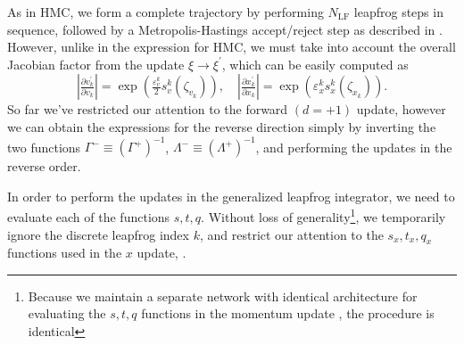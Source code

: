 \documentclass{article} %
\begin{document}
As in HMC, we form a complete trajectory by performing \(N_{\mathrm{LF}}\) leapfrog steps in sequence, followed by a
Metropolis-Hastings accept/reject step as described in .
%
However, unlike in the expression for HMC, we must take into account the overall Jacobian factor from the update
\(\xi\rightarrow\xi^{\prime}\), which can be easily computed as 
%
\begin{equation}
   \left|\tfrac{\partial v^{\prime}_{k}}{\partial v_{k}}\right| 
   = \exp{\left(\tfrac{\varepsilon^{k}_{v}}{2}s^{k}_{v}(\zeta_{v_{k}})\right)},\quad
   \left|\tfrac{\partial x^{\prime}_{k}}{\partial x_{k}}\right| 
   = \exp{\left(\varepsilon^{k}_{x} s^{k}_{x}(\zeta_{x_{k}})\right)}.
\end{equation}
%
So far we've restricted our attention to the forward \((d=+1)\) update, however we can obtain the expressions for the
reverse direction simply by inverting the two functions \(\Gamma^{-}\equiv{\left(\Gamma^{+}\right)}^{-1}\),
\(\Lambda^{-}\equiv{\left(\Lambda^{+}\right)}^{-1}\), and performing the updates in the reverse order.

In order to perform the updates in the generalized leapfrog integrator, we need to evaluate each of the functions
\(s, t, q\).
%
%
Without loss of generality\footnote{Because we maintain a separate network with identical architecture for evaluating
the \(s, t, q\) functions in the momentum update , the procedure is identical},
we temporarily ignore the discrete leapfrog index \(k\), and restrict our attention to the
\(s_{x}, t_{x}, q_{x}\) functions used in the \(x\) update, .
%
\end{document}
